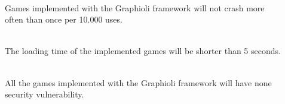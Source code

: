 \vspace{.5cm}

\begin{description}
	\item[] {\bf {}}  \\
	Games implemented with the Graphioli framework will not crash more often than once per 10.000 uses. \\
	\item[] {\bf {}} \\
	The loading time of the implemented games will be shorter than 5 seconds. \\
	\item[] {\bf {}} \\
	All the games implemented with the Graphioli framework will have none security vulnerability.
\end{description}
